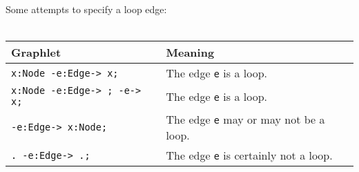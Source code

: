 \begin{example}
Some attempts to specify a loop edge:\\
\mbox{ }\\
\begin{tabular}[c]{ll} 
 \textbf{Graphlet} & \textbf{Meaning} \\ \hline
 \texttt{x:Node -e:Edge-> x;} & The edge \texttt{e} is a loop.\\ 
 \texttt{x:Node -e:Edge-> ; -e-> x;} & The edge \texttt{e} is a loop.\\ 
 \texttt{-e:Edge-> x:Node;} & The edge \texttt{e} may or may not be a loop.\\ 
 \texttt{.\ -e:Edge-> .;} & The edge \texttt{e} is certainly not a loop.\\ 
\end{tabular}
\end{example}

